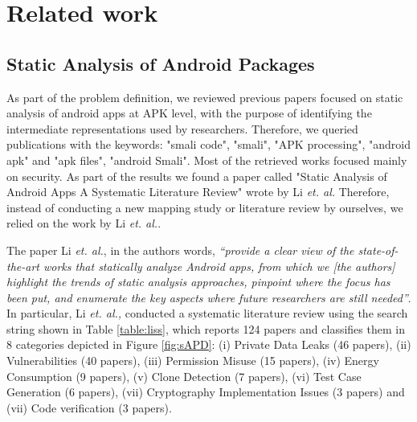 
\chapter{Related work} %


\label{Chapter3} %


\section{Static Analysis of Android Packages}


As part of the problem definition, we reviewed previous papers focused on static analysis of android apps at APK level, with the purpose of identifying the intermediate representations used by researchers. Therefore, we queried publications with  the keywords: "smali code", "smali", "APK processing", "android apk" and "apk files", "android Smali". Most of the retrieved works focused mainly on security. As part of the results we found a paper called "Static Analysis of Android Apps A Systematic Literature Review" \cite{li:IaST2017} wrote by Li \textit{et. al.} Therefore, instead of conducting a new mapping study or literature review by ourselves, we relied on the work by Li \textit{et. al.}.

The paper Li \textit{et. al.}, in the authors words, \textit{``provide a clear view of the state-of-the-art works that statically analyze Android apps, from which we [the authors] highlight the trends of static analysis approaches, pinpoint where the focus has been put, and enumerate the key aspects where future researchers are still needed''}. In particular, Li \textit{et. al.,} conducted a systematic literature review using the search string shown in Table \ref{table:liss}, which reports 124 papers and classifies them in 8 categories depicted in Figure \ref{fig:sAPD}: (i) Private Data Leaks (46 papers), (ii) Vulnerabilities (40 papers), (iii) Permission Misuse (15 papers), (iv) Energy Consumption (9 papers), (v) Clone Detection (7 papers), (vi) Test Case Generation (6 papers), (vii) Cryptography Implementation Issues (3 papers) and (vii) Code verification (3 papers). 

